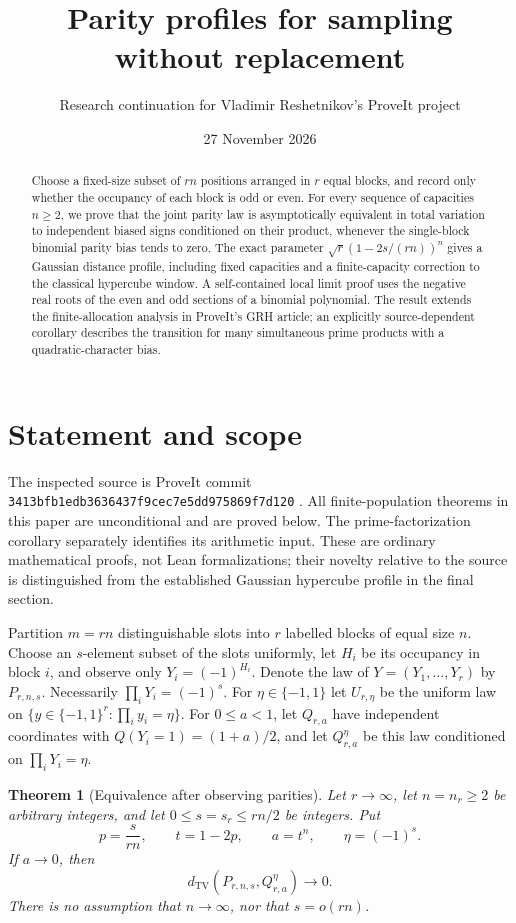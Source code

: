 \documentclass[11pt]{article}
\title{Parity profiles for sampling without replacement}
\author{Research continuation for Vladimir Reshetnikov's ProveIt project}
\date{27 November 2026}
\newtheorem{theorem}{Theorem}
\newcommand{\TV}{d_{\mathrm{TV}}}
\begin{document}
\maketitle

\begin{abstract}
Choose a fixed-size subset of $rn$ positions arranged in $r$ equal blocks,
and record only whether the occupancy of each block is odd or even.
For every sequence of capacities $n\ge2$, we prove that the joint parity
law is asymptotically equivalent in total variation to independent
biased signs conditioned on their product, whenever the single-block
binomial parity bias tends to zero. The exact parameter
$\sqrt r(1-2s/(rn))^n$ gives a Gaussian distance profile, including fixed
capacities and a finite-capacity correction to the classical hypercube
window. A self-contained local limit proof uses the negative real roots
of the even and odd sections of a binomial polynomial. The result
extends the finite-allocation analysis in ProveIt's GRH article;
an explicitly source-dependent corollary describes the transition for
many simultaneous prime products with a quadratic-character bias.
\end{abstract}

\section{Statement and scope}

The inspected source is ProveIt commit
\texttt{3413bfb1edb3636437f9cec7e5dd975869f7d120} \cite{ProveIt}.
All finite-population theorems in this paper are unconditional and are
proved below. The prime-factorization corollary separately identifies
its arithmetic input. These are ordinary mathematical proofs, not Lean
formalizations; their novelty relative to the source is distinguished
from the established Gaussian hypercube profile in the final section.

Partition $m=rn$ distinguishable slots into $r$ labelled blocks of equal size $n$.
Choose an $s$-element subset of the slots uniformly, let $H_i$ be its occupancy in
block $i$, and observe only $Y_i=(-1)^{H_i}$. Denote the law of
$Y=(Y_1,\ldots,Y_r)$ by $P_{r,n,s}$. Necessarily $\prod_iY_i=(-1)^s$.
For $\eta\in\{-1,1\}$ let $U_{r,\eta}$ be the uniform law on
$\{y\in\{-1,1\}^r:\prod_i y_i=\eta\}$.
For $0\le a<1$, let $Q_{r,a}$ have independent coordinates with
$Q(Y_i=1)=(1+a)/2$, and let $Q_{r,a}^{\eta}$ be this law conditioned on
$\prod_iY_i=\eta$.

\begin{theorem}[Equivalence after observing parities]\label{thm:equivalence}
Let $r\to\infty$, let $n=n_r\ge2$ be arbitrary integers, and let
$0\le s=s_r\le rn/2$ be integers. Put
\[
 p=\frac{s}{rn},\qquad t=1-2p,\qquad a=t^n,\qquad\eta=(-1)^s.
\]
If $a\to0$, then
\[
 \TV(P_{r,n,s},Q_{r,a}^{\eta})\longrightarrow0.
\]
There is no assumption that $n\to\infty$, nor that $s=o(rn)$.
\end{theorem}
\end{document}
